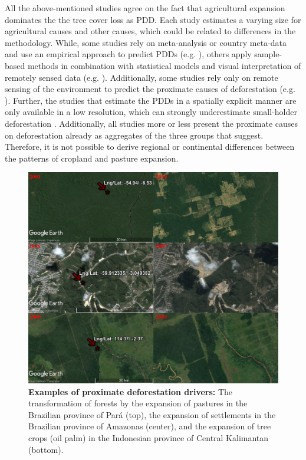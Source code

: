 	All the above-mentioned studies agree on the fact that agricultural expansion dominates the the tree cover loss as \ac{PDD}. Each study estimates a varying size for agricultural causes and other causes, which could be related to differences in the methodology. While, some studies rely on meta-analysis or country meta-data and use an empirical approach to predict \acp{PDD} (e.g. \citet{Hosonuma2012,Geist2002,DeFries2010,Carter2018,Ruf2014}), others apply sample-based methods in combination with statistical models and visual interpretation of remotely sensed data (e.g. \citet{Sy2015,Austin2019,Curtis2018,Meyfroidt2013,Caldas2013}). Additionally, some studies rely only on remote sensing of the environment to predict the proximate causes of deforestation (e.g. \citet{Caldas2013,Zalles2018,Graesser2015,Connette2016,Barima2016}). Further, the studies that estimate the \acp{PDD} in a spatially explicit manner are only available in a low resolution, which can strongly underestimate small-holder deforestation \citep{Curtis2018,Caldas2013}. Additionally, all studies more or less present the proximate causes on deforestation already as aggregates of the three groups that \citet{Geist2001} suggest. Therefore, it is not possible to derive regional or continental differences between the patterns of cropland and pasture expansion.
	\begin{figure}[ht]
		\centering
		\includegraphics[scale=0.53]{img/deforestation_examples}
		\caption[Examples of proximate deforestation drivers]{\textbf{Examples of proximate deforestation drivers:} The transformation of forests by the expansion of pastures in the Brazilian province of Pará (top), the expansion of settlements in the Brazilian province of Amazonas (center), and the expansion of tree crops (oil palm) in the Indonesian province of Central Kalimantan (bottom).}
		\label{fig:deforestationexamples}
	\end{figure}


